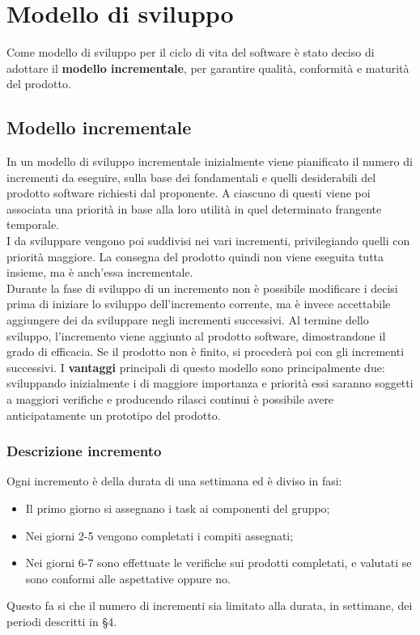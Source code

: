 \documentclass[PianoDiProgetto.tex]{subfiles}
\begin{document}
\chapter{Modello di sviluppo}
Come modello di sviluppo per il ciclo di vita del software è stato deciso di adottare il \textbf{modello incrementale}, per garantire qualità, conformità e maturità del prodotto.

\section{Modello incrementale}
In un modello di sviluppo incrementale inizialmente viene pianificato il numero di incrementi da eseguire, sulla base dei  fondamentali e quelli desiderabili del prodotto software richiesti dal proponente. A ciascuno di questi viene poi associata una priorità in base alla loro utilità in quel determinato frangente temporale.\\
I  da sviluppare vengono poi suddivisi nei vari incrementi, privilegiando quelli con priorità maggiore. La consegna del prodotto quindi non viene eseguita tutta insieme, ma è anch'essa incrementale.\\
Durante la fase di sviluppo di un incremento non è possibile modificare i  decisi prima di iniziare lo sviluppo dell'incremento corrente, ma è invece accettabile aggiungere dei  da sviluppare negli incrementi successivi. Al termine dello sviluppo, l'incremento viene aggiunto al prodotto software, dimostrandone il grado di efficacia. Se il prodotto non è finito, si procederà poi con gli incrementi successivi. I \textbf{vantaggi} principali di questo modello sono principalmente due: sviluppando inizialmente i  di maggiore importanza e priorità essi saranno soggetti a maggiori verifiche e producendo rilasci continui è possibile avere anticipatamente un prototipo del prodotto.

\subsection{Descrizione incremento}
Ogni incremento è della durata di una settimana ed è diviso in fasi:
\begin{itemize}
	\item Il primo giorno si assegnano i task ai componenti del gruppo;
	\item Nei giorni 2-5 vengono completati i compiti assegnati;
	\item Nei giorni 6-7 sono effettuate le verifiche sui prodotti completati, e valutati se sono conformi alle aspettative oppure no.
\end{itemize}
Questo fa si che il numero di incrementi sia limitato alla durata, in settimane, dei periodi descritti in \S 4.
\end{document}
